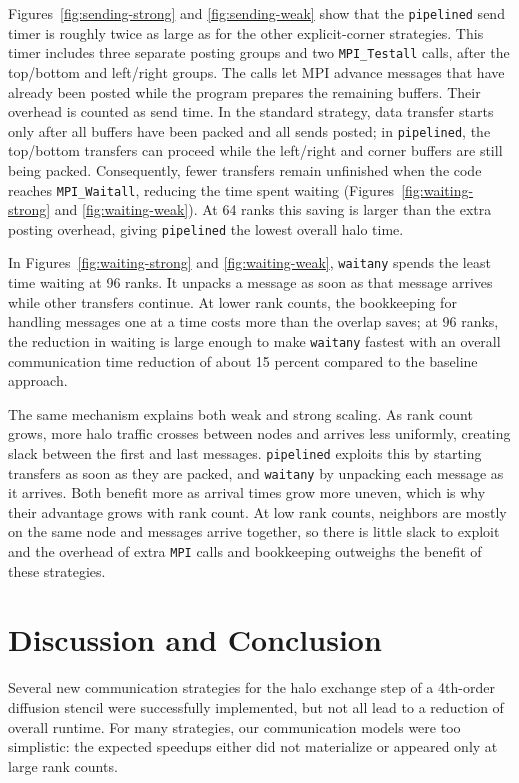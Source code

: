 \documentclass{article}
\begin{document}
Figures~\ref{fig:sending-strong} and \ref{fig:sending-weak} show that the
\texttt{pipelined} send timer is roughly twice as large as for the other
explicit-corner strategies. This timer includes three separate
posting groups and two \texttt{MPI\_Testall} calls, after the top/bottom
and left/right groups. The calls let MPI advance messages that have
already been posted while the program prepares the remaining buffers.
Their overhead is counted as send time. In the standard strategy, data
transfer starts only after all buffers have been packed and all sends
posted; in \texttt{pipelined}, the top/bottom transfers can proceed while
the left/right and corner buffers are still being packed. Consequently,
fewer transfers remain unfinished when the code reaches
\texttt{MPI\_Waitall}, reducing the time spent waiting (Figures~\ref{fig:waiting-strong} and \ref{fig:waiting-weak}). At 64 ranks this
saving is larger than the extra posting overhead, giving
\texttt{pipelined} the lowest overall halo time.

In Figures~\ref{fig:waiting-strong} and \ref{fig:waiting-weak},
\texttt{waitany} spends the least time waiting at 96 ranks. It unpacks a
message as soon as that message arrives while other transfers continue.
At lower rank counts, the bookkeeping for handling messages one at a time
costs more than the overlap saves; at 96 ranks, the reduction in waiting
is large enough to make \texttt{waitany} fastest with an overall communication time reduction of about 15 percent compared to the baseline approach.

The same mechanism explains both weak and strong scaling. As rank
count grows, more halo traffic crosses between nodes and arrives less
uniformly, creating slack between the first and last messages.
\texttt{pipelined} exploits this by starting transfers as soon as they
are packed, and \texttt{waitany} by unpacking each message as it
arrives. Both benefit more as arrival times grow more uneven, which
is why their advantage grows with rank count. At low rank counts,
neighbors are mostly on the same node and messages arrive together, so
there is little slack to exploit and the overhead of extra \texttt{MPI} calls and
bookkeeping outweighs the benefit of these strategies.

\section{Discussion and Conclusion}
\label{sec:discussion}
Several new communication strategies for the halo exchange step of a 4th-order diffusion stencil were successfully implemented, but not all lead to a reduction of overall runtime. For many strategies, our communication models were too simplistic: the expected speedups either did not materialize or appeared only at large rank counts.
\end{document}
